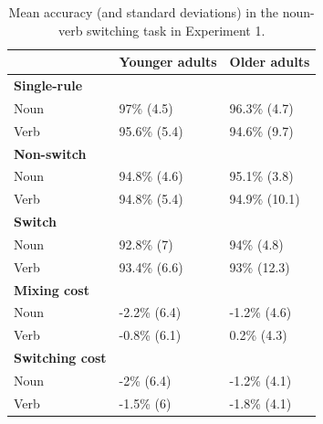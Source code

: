 \documentclass[
]{article}
\begin{document}
\begin{table}[H]

\caption{\label{tab:TableS1}Mean accuracy (and standard deviations) in the noun-verb switching task in Experiment 1.}
\centering
\begin{tabular}[t]{lll}
\toprule
\textbf{} & \textbf{Younger adults} & \textbf{Older adults}\\
\midrule
\textbf{Single-rule} & \textbf{} & \textbf{}\\
Noun & 97\% (4.5) & 96.3\% (4.7)\\
Verb & 95.6\% (5.4) & 94.6\% (9.7)\\
\textbf{Non-switch} & \textbf{} & \textbf{}\\
Noun & 94.8\% (4.6) & 95.1\% (3.8)\\
\addlinespace
Verb & 94.8\% (5.4) & 94.9\% (10.1)\\
\textbf{Switch} & \textbf{} & \textbf{}\\
Noun & 92.8\% (7) & 94\% (4.8)\\
Verb & 93.4\% (6.6) & 93\% (12.3)\\
\textbf{Mixing cost} & \textbf{} & \textbf{}\\
\addlinespace
Noun & -2.2\% (6.4) & -1.2\% (4.6)\\
Verb & -0.8\% (6.1) & 0.2\% (4.3)\\
\textbf{Switching cost} & \textbf{} & \textbf{}\\
Noun & -2\% (6.4) & -1.2\% (4.1)\\
Verb & -1.5\% (6) & -1.8\% (4.1)\\
\bottomrule
\end{tabular}
\end{table}

\newpage
\end{document}
